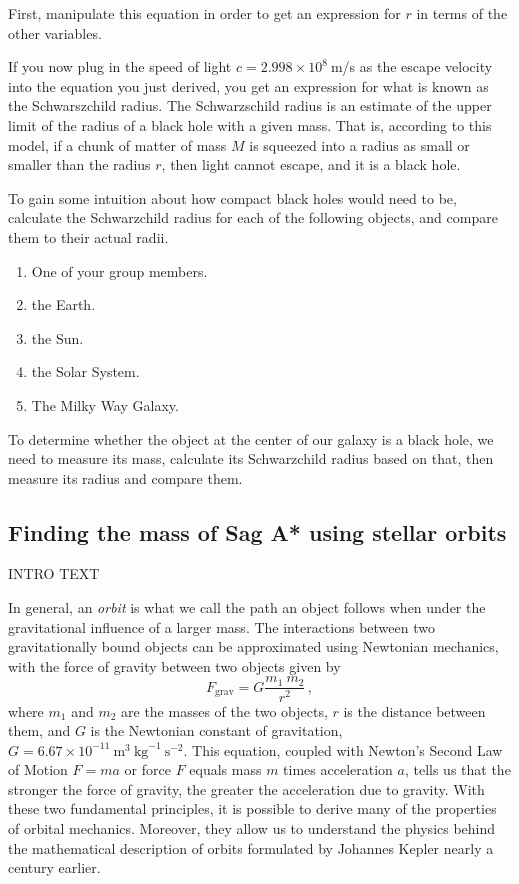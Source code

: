 \begin{steps}
	\item  First, manipulate this equation in order to get an expression for $r$ in terms of the other variables.
\end{steps}
If you now plug in the speed of light $c = 2.998 \times 10^{8}\:$m/s as the escape velocity into the equation you just derived, you get an expression for what is known as the Schwarszchild radius. The Schwarzschild radius is an estimate of the upper limit of the radius of a black hole with a given mass. That is, according to this model, if a chunk of matter of mass $M$ is squeezed into a radius as small or smaller than the radius $r$, then light cannot escape, and it is a black hole.

\begin{steps}
	\item To gain some intuition about how compact black holes would need to be, calculate the Schwarzchild radius for each of the following objects, and compare them to their actual radii.
	\begin{enumerate}
		\item One of your group members.
		\item the Earth.
		\item the Sun.
		\item the Solar System.
		\item The Milky Way Galaxy.
	\end{enumerate}
\end{steps}

To determine whether the object at the center of our galaxy is a black hole, we need to measure its mass, calculate its Schwarzchild radius based on that, then measure its radius and compare them.

\subsection{Finding the mass of Sag A* using stellar orbits}

INTRO TEXT

In general, an \textit{orbit} is what we call the path an object follows when under the gravitational influence of a larger mass. The interactions between two gravitationally bound objects can be approximated using Newtonian mechanics, with the force of gravity between two objects given by 
\begin{equation}\label{gc:eq:newton}
F_\textrm{grav} = G \frac{m_1 \: m_2}{r^2} \, ,
\end{equation}
where $m_1$ and $m_2$ are the masses of the two objects, $r$ is the distance between them, and $G$ is the Newtonian constant of gravitation, $G=6.67 \times 10^{-11}\:\textrm{m}^3 \: \textrm{kg}^{-1} \: \textrm{s}^{-2}$. This equation, coupled with Newton's Second Law of Motion $F = ma$ or force $F$ equals mass $m$ times acceleration $a$, tells us that the stronger the force of gravity, the greater the acceleration due to gravity. With these two fundamental principles, it is possible to derive many of the properties of orbital mechanics. Moreover, they allow us to understand the physics behind the mathematical description of orbits formulated by Johannes Kepler nearly a century earlier.

